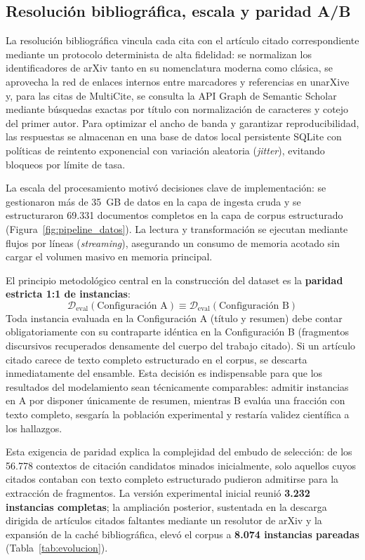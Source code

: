 \documentclass[10pt,a4paper,twocolumn]{article}
\begin{document}
\subsection{Resolución bibliográfica, escala y paridad A/B}
La resolución bibliográfica vincula cada cita con el artículo citado correspondiente mediante un protocolo determinista de alta fidelidad: se normalizan los identificadores de arXiv tanto en su nomenclatura moderna como clásica, se aprovecha la red de enlaces internos entre marcadores y referencias en unarXive \cite{Besrour2026} y, para las citas de MultiCite, se consulta la API Graph de Semantic Scholar mediante búsquedas exactas por título con normalización de caracteres y cotejo del primer autor. Para optimizar el ancho de banda y garantizar reproducibilidad, las respuestas se almacenan en una base de datos local persistente SQLite con políticas de reintento exponencial con variación aleatoria (\textit{jitter}), evitando bloqueos por límite de tasa.

La escala del procesamiento motivó decisiones clave de implementación: se gestionaron más de 35~GB de datos en la capa de ingesta cruda y se estructuraron 69.331 documentos completos en la capa de corpus estructurado (Figura~\ref{fig:pipeline_datos}). La lectura y transformación se ejecutan mediante flujos por líneas (\textit{streaming}), asegurando un consumo de memoria acotado sin cargar el volumen masivo en memoria principal.

El principio metodológico central en la construcción del dataset es la \textbf{paridad estricta 1:1 de instancias}:
\[
 \mathcal{D}_{\text{eval}}(\text{Configuración A}) \equiv \mathcal{D}_{\text{eval}}(\text{Configuración B})
\]
Toda instancia evaluada en la Configuración A (título y resumen) debe contar obligatoriamente con su contraparte idéntica en la Configuración B (fragmentos discursivos recuperados densamente del cuerpo del trabajo citado). Si un artículo citado carece de texto completo estructurado en el corpus, se descarta inmediatamente del ensamble. Esta decisión es indispensable para que los resultados del modelamiento sean técnicamente comparables: admitir instancias en A por disponer únicamente de resumen, mientras B evalúa una fracción con texto completo, sesgaría la población experimental y restaría validez científica a los hallazgos.

Esta exigencia de paridad explica la complejidad del embudo de selección: de los 56.778 contextos de citación candidatos minados inicialmente, solo aquellos cuyos citados contaban con texto completo estructurado pudieron admitirse para la extracción de fragmentos. La versión experimental inicial reunió \textbf{3.232 instancias completas}; la ampliación posterior, sustentada en la descarga dirigida de artículos citados faltantes mediante un resolutor de arXiv y la expansión de la caché bibliográfica, elevó el corpus a \textbf{8.074 instancias pareadas} (Tabla~\ref{tab:evolucion}).
\end{document}
